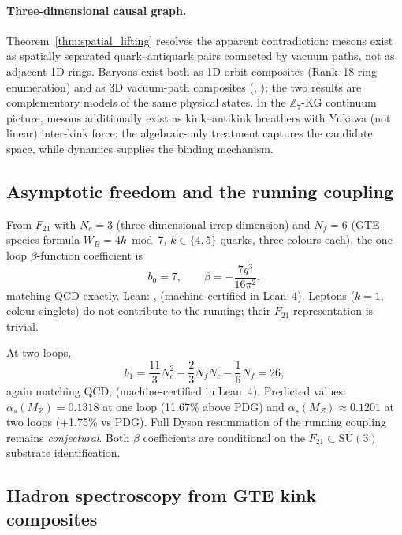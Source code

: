 \paragraph{Three-dimensional causal graph.}
Theorem~\ref{thm:spatial_lifting} resolves the apparent contradiction: mesons exist as spatially separated quark--antiquark pairs connected by vacuum paths, not as adjacent 1D rings.
Baryons exist both as 1D orbit composites (Rank~18 ring enumeration) and as 3D vacuum-path composites (, ); the two results are complementary models of the same physical states.
In the $\mathbb{Z}_7$-KG continuum picture, mesons additionally exist as kink--antikink breathers with Yukawa (not linear) inter-kink force; the algebraic-only treatment captures the candidate space, while dynamics supplies the binding mechanism.

\subsection{Asymptotic freedom and the running coupling}
\label{sec:asymptotic_freedom}

From $F_{21}$ with $N_c = 3$ (three-dimensional irrep dimension) and $N_f = 6$ (GTE species formula $W_B = 4k \bmod 7$, $k \in \{4,5\}$ quarks, three colours each), the one-loop $\beta$-function coefficient is
\begin{equation}
b_0 = 7, \qquad \beta = -\frac{7 g^3}{16\pi^2},
\label{eq:beta_one_loop}
\end{equation}
matching QCD exactly.
Lean: ,  (machine-certified in Lean~4).
Leptons ($k=1$, colour singlets) do not contribute to the running; their $F_{21}$ representation is trivial.

At two loops,
\begin{equation}
b_1 = \frac{11}{3} N_c^2 - \frac{2}{3} N_f N_c - \frac{1}{6} N_f = 26,
\label{eq:beta_two_loop}
\end{equation}
again matching QCD;  (machine-certified in Lean~4).
Predicted values: $\alpha_s(M_Z) = 0.1318$ at one loop (11.67\% above PDG) and $\alpha_s(M_Z) \approx 0.1201$ at two loops (+1.75\% vs PDG).
Full Dyson resummation of the running coupling remains \emph{conjectural}.
Both $\beta$ coefficients are conditional on the $F_{21} \subset \mathrm{SU}(3)$ substrate identification.

\subsection{Hadron spectroscopy from GTE kink composites}
\label{sec:hadron_spectroscopy}


